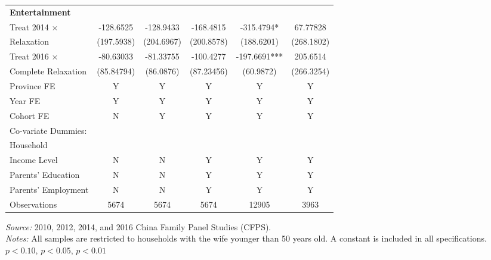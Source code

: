 \documentclass[12pt]{extarticle}
\begin{document}
\begin{table}
\begin{threeparttable}
\begin{tabular}{l*{5}{c}}
\textbf{Entertainment} \\
Treat 2014 $\times$ &   -128.6525   &   -128.9433   &   -168.4815   &   -315.4794*  &    67.77828   \\
\quad 2014 Relaxation     &  (197.5938)   &  (204.6967)   &  (200.8578)   &  (188.6201)   &  (268.1802)   \\
Treat 2016 $\times$ &   -80.63033   &   -81.33755   &   -100.4277   &   -197.6691***&    205.6514   \\
\quad Complete Relaxation &  (85.84794)   &   (86.0876)   &  (87.23456)   &   (60.9872)   &  (266.3254)   \\
\hline
Province FE &  Y &  Y & Y & Y & Y \\
Year FE &  Y &  Y & Y & Y & Y \\
Cohort FE & N & Y & Y & Y & Y \\
Co-variate Dummies: \\
\quad Household \\
\qquad Income Level & N & N & Y & Y & Y \\
\quad Parents' Education &  N &  N & Y & Y & Y \\
\quad Parents' Employment &  N &  N & Y & Y & Y \\
\hline
Observations        &       5674        &       5674         &       5674         &       12905         &        3963 \\
\hline\hline
\end{tabular}
\begin{tablenotes}
\footnotesize \textit{Source:} 2010, 2012, 2014, and 2016 China Family Panel Studies (CFPS). \\
\textit{Notes:} All samples are restricted to households with the wife younger than 50 years old. A constant is included in all specifications. \\
\quad \sym{*} \(p<0.10\), \sym{**} \(p<0.05\), \sym{***} \(p<0.01\)
\end{tablenotes}
\end{threeparttable}
\end{table}
\end{document}
